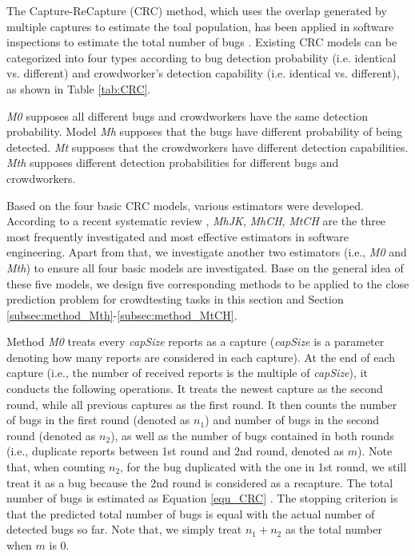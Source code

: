 \documentclass[sigconf,review, anonymous]{acmart}
\begin{document}
The Capture-ReCapture (CRC) method, which uses the overlap generated by multiple captures to estimate the toal population, has been applied in software inspections to estimate the total number of bugs \cite{rong2017towards,liu2015adoption,chun2006estimating,mandala2012application}. Existing CRC models can be categorized into four types according to bug detection probability (i.e. identical vs. different) and crowdworker's detection capability (i.e. identical vs. different), as shown in Table \ref{tab:CRC}.

\textit{M0} supposes all different bugs and crowdworkers have the same detection probability. Model \textit{Mh} supposes that the bugs have different probability of being detected. \textit{Mt} supposes that the crowdworkers have different detection capabilities. \textit{Mth} supposes different detection probabilities for different bugs and crowdworkers.




Based on the four basic CRC models, various estimators were developed. %
According to a recent systematic review \cite{liu2015adoption}, \textit{MhJK}, \textit{MhCH}, \textit{MtCH} are the three most frequently investigated and most effective estimators in software engineering.
Apart from that, we investigate another two estimators (i.e., \textit{M0} and \textit{Mth}) to ensure all four basic models are investigated.
Base on the general idea of these five models, we design five corresponding methods to be applied to the close prediction problem for crowdtesting tasks in this section and Section \ref{subsec:method_Mth}-\ref{subsec:method_MtCH}.

Method \textit{M0} treats every \textit{capSize} reports as a capture (\textit{capSize} is a parameter denoting how many reports are considered in each capture).
At the end of each capture (i.e., the number of received reports is the multiple of \textit{capSize}), it conducts the following operations.
It treats the newest capture as the second round, while all previous captures as the first round.
It then counts the number of bugs in the first round (denoted as $n_1$) and number of bugs in the second round (denoted as $n_2$), as well as the number of bugs contained in both rounds (i.e., duplicate reports between 1st round and 2nd round, denoted as $m$).
Note that, when counting $n_2$, for the bug duplicated with the one in 1st round, we still treat it as a bug because the 2nd round is considered as a recapture. 
The total number of bugs is estimated as Equation \ref{equ_CRC} \cite{M0laplace1783naissances}.
The stopping criterion is that the predicted total number of bugs is equal with the actual number of detected bugs so far.
Note that, we simply treat $n_1 + n_2$ as the total number when $m$ is 0.
\end{document}
